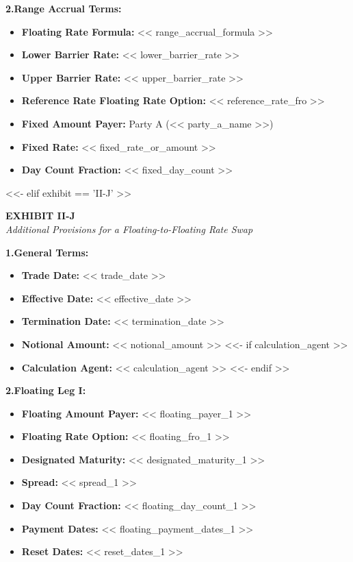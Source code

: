 \documentclass[11pt, a4paper]{article}
\begin{document}
\vspace{0.3cm}
\noindent \textbf{2.\quad Range Accrual Terms:}
\begin{itemize}[leftmargin=2cm, label={}, itemsep=3pt]
    \item \textbf{Floating Rate Formula:} << range_accrual_formula >>
    \item \textbf{Lower Barrier Rate:} << lower_barrier_rate >>
    \item \textbf{Upper Barrier Rate:} << upper_barrier_rate >>
    \item \textbf{Reference Rate Floating Rate Option:} << reference_rate_fro >>
    \item \textbf{Fixed Amount Payer:} Party A (<< party_a_name >>)
    \item \textbf{Fixed Rate:} << fixed_rate_or_amount >>
    \item \textbf{Day Count Fraction:} << fixed_day_count >>
\end{itemize}

<<- elif exhibit == 'II-J' >>
\begin{center}
    \textbf{EXHIBIT II-J} \\
    \textit{Additional Provisions for a Floating-to-Floating Rate Swap}
\end{center}

\vspace{0.3cm}
\noindent \textbf{1.\quad General Terms:}
\begin{itemize}[leftmargin=2cm, label={}, itemsep=3pt]
    \item \textbf{Trade Date:} << trade_date >>
    \item \textbf{Effective Date:} << effective_date >>
    \item \textbf{Termination Date:} << termination_date >>
    \item \textbf{Notional Amount:} << notional_amount >>
<<- if calculation_agent >>
    \item \textbf{Calculation Agent:} << calculation_agent >>
<<- endif >>
\end{itemize}

\vspace{0.3cm}
\noindent \textbf{2.\quad Floating Leg I:}
\begin{itemize}[leftmargin=2cm, label={}, itemsep=3pt]
    \item \textbf{Floating Amount Payer:} << floating_payer_1 >>
    \item \textbf{Floating Rate Option:} << floating_fro_1 >>
    \item \textbf{Designated Maturity:} << designated_maturity_1 >>
    \item \textbf{Spread:} << spread_1 >>
    \item \textbf{Day Count Fraction:} << floating_day_count_1 >>
    \item \textbf{Payment Dates:} << floating_payment_dates_1 >>
    \item \textbf{Reset Dates:} << reset_dates_1 >>
\end{itemize}
\end{document}
